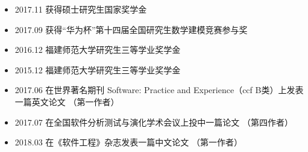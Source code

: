 \documentclass[zh]{resume}
\begin{document}
\begin{itemize}
  \item 2017.11 获得硕士研究生国家奖学金
  \item 2017.09 获得“华为杯”第十四届全国研究生数学建模竞赛参与奖
  \item 2016.12 福建师范大学研究生三等学业奖学金
  \item 2015.12 福建师范大学研究生三等学业奖学金
\end{itemize}

\begin{itemize}
  \item 2017.06 在世界著名期刊 Software: Practice and Experience（ccf B类）上发表一篇英文论文
    （第一作者）
  \item 2017.07 在全国软件分析测试与演化学术会议上投中一篇论文
    （第四作者）
  \item 2018.03 在《软件工程》杂志发表一篇中文论文
   （第一作者）
\end{itemize}
\end{document}
